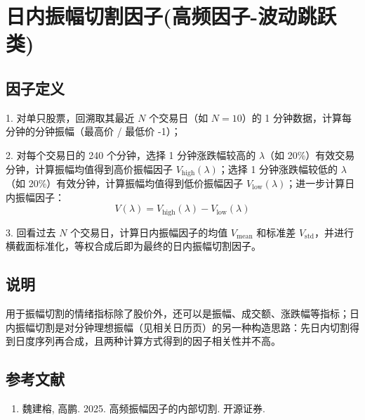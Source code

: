 \documentclass{article}
\begin{document}
\section{日内振幅切割因子(高频因子-波动跳跃类)}

\subsection{因子定义}


1. 对单只股票，回溯取其最近 \( N \) 个交易日（如 \( N=10 \)）的 1 分钟数据，计算每分钟的分钟振幅（最高价 / 最低价 -1）；

2. 对每个交易日的 240 个分钟，选择 1 分钟涨跌幅较高的 \( \lambda \)（如 20\%）有效交易分钟，计算振幅均值得到高价振幅因子 \( V_{\text{high}}(\lambda) \)；选择 1 分钟涨跌幅较低的 \( \lambda \)（如 20\%）有效分钟，计算振幅均值得到低价振幅因子 \( V_{\text{low}}(\lambda) \)；进一步计算日内振幅因子：
\begin{equation}
    V(\lambda) = V_{\text{high}}(\lambda) - V_{\text{low}}(\lambda)
\end{equation}

3. 回看过去 \( N \) 个交易日，计算日内振幅因子的均值 \( V_{\text{mean}} \) 和标准差 \( V_{\text{std}} \)，并进行横截面标准化，等权合成后即为最终的日内振幅切割因子。

\subsection{说明}
用于振幅切割的情绪指标除了股价外，还可以是振幅、成交额、涨跌幅等指标；日内振幅切割是对分钟理想振幅（见相关日历页）的另一种构造思路：先日内切割得到日度序列再合成，且两种计算方式得到的因子相关性并不高。

\subsection{参考文献}
\begin{enumerate}
    \item 魏建榕, 高鹏. 2025. 高频振幅因子的内部切割. 开源证券.
\end{enumerate}
\end{document}

